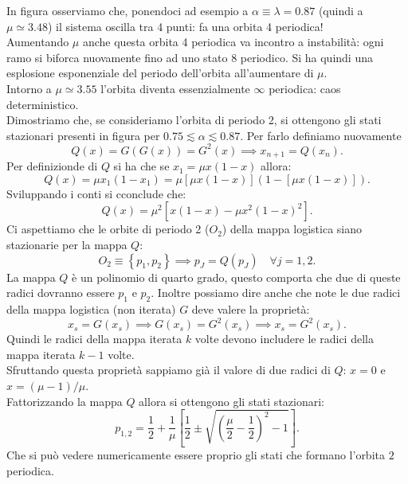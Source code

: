\noindent
In figura osserviamo che, ponendoci ad esempio a $\alpha  \equiv \lambda  = 0.87$ (quindi a $\mu\simeq 3.48$) il sistema oscilla tra 4 punti: fa una orbita 4 periodica!\\
Aumentando $\mu$ anche questa orbita 4 periodica va incontro a instabilità: ogni ramo si biforca nuovamente fino ad uno stato 8 periodico. Si ha quindi una esplosione esponenziale del periodo dell'orbita all'aumentare di $\mu$.\\
Intorno a $\mu\simeq 3.55$ l'orbita diventa essenzialmente $\infty$ periodica: caos deterministico.\\
Dimostriamo che, se consideriamo l'orbita di periodo 2, si ottengono gli stati stazionari presenti in figura per $0.75\lesssim \alpha\lesssim 0.87$. Per farlo definiamo nuovamente 
\[
    Q(x) = G(G(x)) = G^2(x) \implies  x_{n+1} = Q(x_n) 
.\] 
Per definizionde di $Q$ si ha che se $x_1 = \mu x(1-x)$ allora:
\[
    Q(x) = \mu x_1(1-x_1) = \mu\left[\mu x(1-x)\right](1-\left[\mu x(1-x) \right]) 
.\] 
Sviluppando i conti si cconclude che:
\[
    Q(x) = \mu^2\left[x(1-x)-\mu x^2(1-x)^2\right]
.\] 
Ci aspettiamo che le orbite di periodo 2 ($O_2$) della mappa logistica siano stazionarie per la mappa $Q$:
\[
    O_2 \equiv \left\{p_1, p_2\right\} \implies  p_J = Q(p_J) \quad  \forall j = 1, 2
.\] 
La mappa $Q$ è un polinomio di quarto grado, questo comporta che due di queste radici dovranno essere $p_1$ e $p_2$. Inoltre possiamo dire anche che note le due radici della mappa logistica (non iterata) $G$ deve valere la proprietà:
\[
    x_s = G(x_s) \implies  G(x_s) = G^2(x_s) \implies  x_s = G^2(x_s) 
.\] 
Quindi le radici della mappa iterata $k$ volte devono includere le radici della mappa iterata $k-1$ volte.\\
Sfruttando questa proprietà sappiamo già il valore di due radici di $Q$: $x=0$ e $x=(\mu-1)/\mu$.\\
Fattorizzando la mappa $Q$ allora si ottengono gli stati stazionari:
\[
    p_{1, 2} = \frac{1}{2} + \frac{1}{\mu}\left[\frac{1}{2}\pm \sqrt{\left(\frac{\mu}{2}-\frac{1}{2}\right)^2-1} \right]
.\] 
Che si può vedere numericamente essere proprio gli stati che formano l'orbita $2$ periodica.
